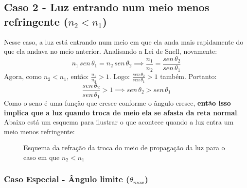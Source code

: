 \documentclass[12pt]{extarticle}
\newcommand{\<}{\langle}
\renewcommand{\>}{\rangle}
\theoremstyle{definition}
\begin{document}
\subsection{Caso 2 - Luz entrando num meio menos refringente ($n_2<n_1$)}

Nesse caso, a luz está entrando num meio em que ela anda mais rapidamente do que ela andava no meio anterior. Analisando a Lei de Snell, novamente:
\begin{equation}
     n_1\,sen\,\theta_1 = n_2\,sen\,\theta_2 \implies \frac{n_1}{n_2} = \frac{sen\,\theta_2}{sen\,\theta_1}
\end{equation}
Agora, como $n_2<n_1$, então: $\frac{n_1}{n_2} >1$. Logo: $\frac{sen\,\theta_2}{sen\,\theta_1}>1$ também. Portanto:
\begin{equation}
    \frac{sen\,\theta_2}{sen\,\theta_1}>1 \implies \boxed{sen\,\theta_2 > sen\,\theta_1}
\end{equation}
Como o seno é uma função que cresce conforme o ângulo cresce, \textbf{então isso implica que a luz quando troca de meio ela se afasta da reta normal}. Abaixo está um esquema para ilustrar o que acontece quando a luz entra um meio menos refringente:
\begin{figure}[H]
    \centering
    \caption{Esquema da refração da troca do meio de propagação da luz para o caso em que $n_2<n_1$}
    \label{fig:refracao_2}
\end{figure}

\subsubsection{Caso Especial - Ângulo limite ($\theta_{max}$)}
\end{document}
